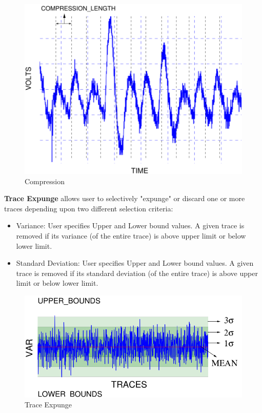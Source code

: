 \documentclass{llncs}
\numberwithin{algorithm}{chapter}
\begin{document}
\begin{figure}[ht]
\begin{center}
\includegraphics[scale=0.6]{figures/compression}
\caption{\label{fig:cmp}Compression}
\end{center} 
\vspace{-3ex}
\end{figure}

\textbf{Trace Expunge} allows user to selectively "expunge" or discard one or more traces 
depending upon two different selection criteria:

\begin{itemize}
\item Variance: User specifies Upper and Lower bound values. A given trace is removed if its variance (of the entire trace)
is above upper limit or below lower limit.
\item Standard Deviation: User specifies Upper and Lower bound values. A given trace is removed if its standard 
deviation (of the entire trace) is above upper limit or below lower limit.
\end{itemize}

\begin{figure}[ht]
\begin{center}
\includegraphics[scale=0.6]{figures/traceExpungMod}
\caption{\label{fig:tex}Trace Expunge}
\end{center} 
\vspace{-3ex}
\end{figure}
\end{document}
